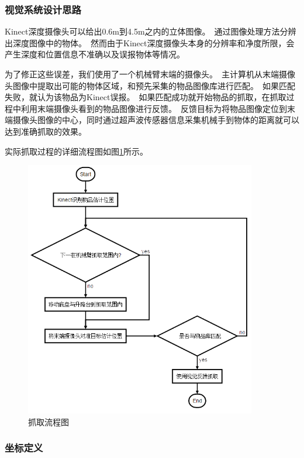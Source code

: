 \subsubsection{视觉系统设计思路}
Kinect深度摄像头可以给出0.6m到4.5m之内的立体图像。\ 通过图像处理方法分辨出深度图像中的物体。\ 然而由于Kinect深度摄像头本身的分辨率和净度所限，会产生深度和位置信息不准确以及误报物体等情况。\ 

为了修正这些误差，我们使用了一个机械臂末端的摄像头。\ 主计算机从末端摄像头图像中提取出可能的物体区域，和预先采集的物品图像库进行匹配。\ 如果匹配失败，就认为该物品为Kinect误报。\ 如果匹配成功就开始物品的抓取，在抓取过程中利用末端摄像头看到的物品图像进行反馈。\ 反馈目标为将物品图像定位到末端摄像头图像的中心，同时通过超声波传感器信息采集机械手到物体的距离就可以达到准确抓取的效果。\ 

实际抓取过程的详细流程图如图\ref{fig:flowchart}所示。\ 

\begin{figure}
	\centering
    \includegraphics[width = 0.9\textwidth]{images/flow.png}
    \caption{抓取流程图}
    \label{fig:flowchart}
\end{figure}

\subsubsection{坐标定义}

